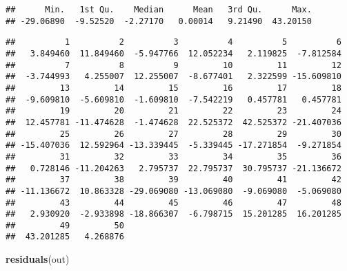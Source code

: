 \documentclass[]{article}
\newenvironment{Shaded}{\begin{snugshade}}{\end{snugshade}}
\newcommand{\KeywordTok}[1]{\textcolor[rgb]{0.13,0.29,0.53}{\textbf{#1}}}
\newcommand{\CommentTok}[1]{\textcolor[rgb]{0.56,0.35,0.01}{\textit{#1}}}
\newcommand{\OperatorTok}[1]{\textcolor[rgb]{0.81,0.36,0.00}{\textbf{#1}}}
\newcommand{\NormalTok}[1]{#1}
\begin{document}
\begin{verbatim}
##      Min.   1st Qu.    Median      Mean   3rd Qu.      Max. 
## -29.06890  -9.52520  -2.27170   0.00014   9.21490  43.20150
\end{verbatim}

\begin{Shaded}
\end{Shaded}

\begin{verbatim}
##          1          2          3          4          5          6 
##   3.849460  11.849460  -5.947766  12.052234   2.119825  -7.812584 
##          7          8          9         10         11         12 
##  -3.744993   4.255007  12.255007  -8.677401   2.322599 -15.609810 
##         13         14         15         16         17         18 
##  -9.609810  -5.609810  -1.609810  -7.542219   0.457781   0.457781 
##         19         20         21         22         23         24 
##  12.457781 -11.474628  -1.474628  22.525372  42.525372 -21.407036 
##         25         26         27         28         29         30 
## -15.407036  12.592964 -13.339445  -5.339445 -17.271854  -9.271854 
##         31         32         33         34         35         36 
##   0.728146 -11.204263   2.795737  22.795737  30.795737 -21.136672 
##         37         38         39         40         41         42 
## -11.136672  10.863328 -29.069080 -13.069080  -9.069080  -5.069080 
##         43         44         45         46         47         48 
##   2.930920  -2.933898 -18.866307  -6.798715  15.201285  16.201285 
##         49         50 
##  43.201285   4.268876
\end{verbatim}

\begin{Shaded}
\begin{Highlighting}[]
\KeywordTok{residuals}\NormalTok{(out)}
\end{Highlighting}
\end{Shaded}
\end{document}
